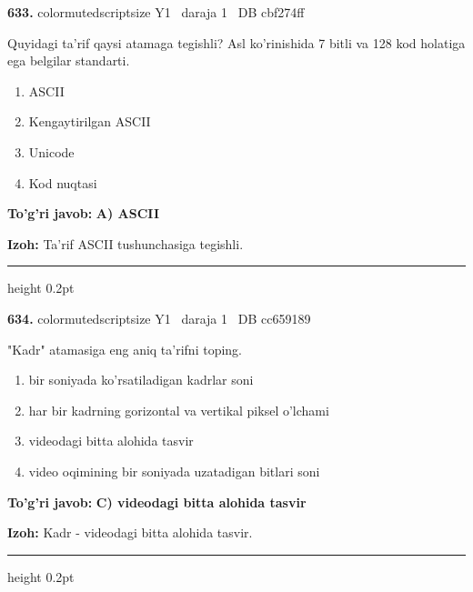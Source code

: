 \documentclass[10pt,a4paper,oneside]{article}
\begin{document}
\noindent\textbf{\color{ink}633.}  {color{muted}scriptsize Y1 \textbullet\ daraja 1 \textbullet\ DB cbf274ff}
\par
Quyidagi ta'rif qaysi atamaga tegishli? Asl ko'rinishida 7 bitli va 128 kod holatiga ega belgilar standarti.
\begin{enumerate}[label=\Alph*),leftmargin=9mm]
\item ASCII
\item Kengaytirilgan ASCII
\item Unicode
\item Kod nuqtasi
\end{enumerate}
\begin{tcolorbox}[enhanced,breakable,colback=teal!4,colframe=teal!50!black,boxrule=0.5pt,arc=1.1mm,left=3mm,right=3mm,top=1.7mm,bottom=1.7mm,before skip=2mm,after skip=2mm]
\textbf{\color{teal}To'g'ri javob:} \textbf{A) ASCII}
\par\smallskip
\textbf{Izoh:} Ta'rif ASCII tushunchasiga tegishli.
\end{tcolorbox}
\vspace{2mm}\hrule height 0.2pt \vspace{3mm}

\noindent\textbf{\color{ink}634.}  {color{muted}scriptsize Y1 \textbullet\ daraja 1 \textbullet\ DB cc659189}
\par
"Kadr" atamasiga eng aniq ta'rifni toping.
\begin{enumerate}[label=\Alph*),leftmargin=9mm]
\item bir soniyada ko'rsatiladigan kadrlar soni
\item har bir kadrning gorizontal va vertikal piksel o'lchami
\item videodagi bitta alohida tasvir
\item video oqimining bir soniyada uzatadigan bitlari soni
\end{enumerate}
\begin{tcolorbox}[enhanced,breakable,colback=teal!4,colframe=teal!50!black,boxrule=0.5pt,arc=1.1mm,left=3mm,right=3mm,top=1.7mm,bottom=1.7mm,before skip=2mm,after skip=2mm]
\textbf{\color{teal}To'g'ri javob:} \textbf{C) videodagi bitta alohida tasvir}
\par\smallskip
\textbf{Izoh:} Kadr - videodagi bitta alohida tasvir.
\end{tcolorbox}
\vspace{2mm}\hrule height 0.2pt \vspace{3mm}
\end{document}
